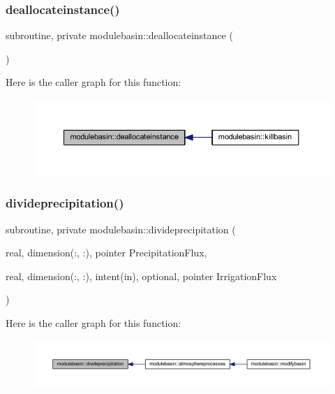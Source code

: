 \subsubsection{\texorpdfstring{deallocateinstance()}{deallocateinstance()}}
{\footnotesize\ttfamily subroutine, private modulebasin\+::deallocateinstance (\begin{DoxyParamCaption}{ }\end{DoxyParamCaption})\hspace{0.3cm}{\ttfamily [private]}}

Here is the caller graph for this function\+:\nopagebreak
\begin{figure}[H]
\begin{center}
\leavevmode
\includegraphics[width=350pt]{namespacemodulebasin_a1aae2d1fbf8f2ccffa519261e67515b3_icgraph}
\end{center}
\end{figure}
\mbox{\label{namespacemodulebasin_a4c084fc559ce2dc2a135a4e171d15024}} 
\subsubsection{\texorpdfstring{divideprecipitation()}{divideprecipitation()}}
{\footnotesize\ttfamily subroutine, private modulebasin\+::divideprecipitation (\begin{DoxyParamCaption}\item[{real, dimension(\+:, \+:), pointer}]{Precipitation\+Flux,  }\item[{real, dimension(\+:, \+:), intent(in), optional, pointer}]{Irrigation\+Flux }\end{DoxyParamCaption})\hspace{0.3cm}{\ttfamily [private]}}

Here is the caller graph for this function\+:\nopagebreak
\begin{figure}[H]
\begin{center}
\leavevmode
\includegraphics[width=350pt]{namespacemodulebasin_a4c084fc559ce2dc2a135a4e171d15024_icgraph}
\end{center}
\end{figure}
\mbox{\label{namespacemodulebasin_a9ece838b83c6e7f083c271a95dbb460f}} 
